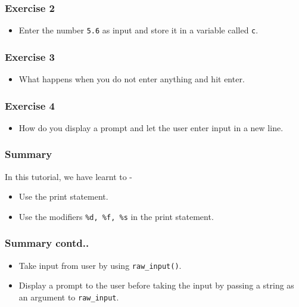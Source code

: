 \documentclass[17pt,compress]{beamer}
\begin{document}
\begin{frame}
\frametitle{Exercise 2}
\label{sec-4}


\begin{itemize}
\item Enter the number \texttt{5.6} as input and store it in a variable called
  \texttt{c}.
\end{itemize}
\end{frame}
\begin{frame}
\frametitle{Exercise 3}
\label{sec-5}


\begin{itemize}
\item What happens when you do not enter anything and hit enter.
\end{itemize}
\end{frame}
\begin{frame}
\frametitle{Exercise 4}
\label{sec-6}


\begin{itemize}
\item How do you display a prompt and let the user enter input in a new line.
\end{itemize}
\end{frame}
\begin{frame}
\frametitle{Summary}
\label{sec-7.1}

 In this tutorial, we have learnt to -


\begin{itemize}
\item Use the print statement.
\item Use the modifiers \texttt{\%d, \%f, \%s} in the print statement.
\end{itemize}
\end{frame}
\begin{frame}
\frametitle{Summary contd..}
\label{sec-7.2}

\begin{itemize}
\item Take input from user by using \texttt{raw\_input()}.
\item Display a prompt to the user before taking the input by passing 
    a string as an argument to \texttt{raw\_input}.
\end{itemize}
\end{frame}
\end{document}

